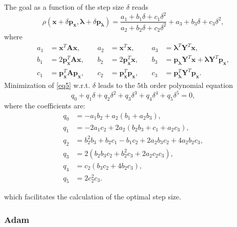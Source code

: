 The goal as a function of the step size $\delta$ reads
\begin{equation}
	\rho\left(\mathbf{x}+\delta \mathbf{p}_{\mathbf{x}},\bm{\lambda}+\delta \mathbf{p}_{\bm{\lambda}}\right) = \frac{a_1+b_1\delta+c_1\delta^2}{a_2+b_2\delta+c_2\delta^2} + a_3+b_3\delta + c_3 \delta^2,
	\label{eq5}
\end{equation}
where
\begin{align*}
	a_1 &= \mathbf{x}^T\mathbf{A}\mathbf{x}, & \quad a_2 &= \mathbf{x}^T\mathbf{x}, & \quad a_3 &= \bm{\lambda}^T\mathbf{Y}^T\mathbf{x}, \\
	b_1 &= 2 \mathbf{p}_{\mathbf{x}}^T\mathbf{A}\mathbf{x}, & \quad b_2 &= 2\mathbf{p}_{\mathbf{x}}^T\mathbf{x}, & \quad b_3 &=  \mathbf{p}_{\bm{\lambda}} \mathbf{Y}^T \mathbf{x} + \bm{\lambda}\mathbf{Y}^T\mathbf{p}_{\mathbf{x}}, \\
	c_1 &= \mathbf{p}_{\mathbf{x}}^T \mathbf{A} \mathbf{p}_{\mathbf{x}}, & \quad c_2 &= \mathbf{p}_{\mathbf{x}}^T\mathbf{p}_{\mathbf{x}}, &  \quad c_3 &= \mathbf{p}_{\bm{\lambda}}^T\mathbf{Y}^T\mathbf{p}_{\mathbf{x}}.
\end{align*}
Minimization of \ref{eq5} w.r.t. $\delta$ leads to the $5$th order polynomial equation
\begin{equation}
	q_0 + q_1 \delta + q_2 \delta^2 + q_3 \delta^3 + q_4 \delta^4 +q_5 \delta^5 = 0,
\end{equation}
where the coefficients are:
\begin{align*}
	q_0 &= -a_1 b_2 + a_2 (b_1 + a_2 b_3),\\
	q_1 &= -2 a_1 c_2 + 2 a_2 (b_2 b_3 + c_1 + a_2 c_3),\\ 
	q_2 &= b_2^2 b_3 + b_2 c_1 - b_1 c_2 + 2 a_2 b_3 c_2 + 4 a_2 b_2 c_3, \\
	q_3 &= 2 (b_2 b_3 c_2 + b_2^2 c_3 + 2 a_2 c_2 c_3),\\
	q_4 &= c_2 (b_3 c_2 + 4 b_2 c_3),\\
	q_5 &= 2 c_2^2 c_3.
\end{align*}

which facilitates the calculation of the optimal step size.

\subsubsection{Adam}

\cite{kingma_adam:_2017}


